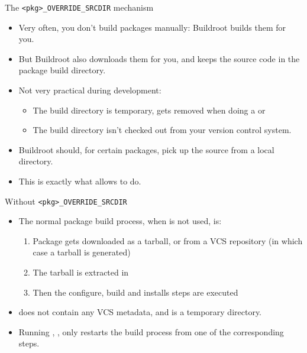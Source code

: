 \begin{frame}{The {\tt <pkg>\_OVERRIDE\_SRCDIR} mechanism}
  \begin{itemize}
  \item Very often, you don't build packages manually: Buildroot
    builds them for you.
  \item But Buildroot also downloads them for you, and keeps the
    source code in the package build directory.
  \item Not very practical during development:
    \begin{itemize}
    \item The build directory is temporary, gets removed when doing a
       or 
    \item The build directory isn't checked out from your version
      control system.
    \end{itemize}
  \item Buildroot should, for certain packages, pick up the source
    from a local directory.
  \item This is exactly what  allows to
    do.
  \end{itemize}
\end{frame}

\begin{frame}{Without {\tt <pkg>\_OVERRIDE\_SRCDIR}}
  \begin{itemize}
  \item The normal package build process, when
     is not used, is:
    \begin{enumerate}
    \item Package gets downloaded as a tarball, or from a VCS
      repository (in which case a tarball is generated)
    \item The tarball is extracted in
    \item Then the configure, build and installs steps are executed
    \end{enumerate}
  \item {} does not contain any VCS
    metadata, and is a temporary directory.
  \item Running , ,  only restarts the
    build process from one of the corresponding steps.
  \end{itemize}
\end{frame}

